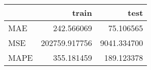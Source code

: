 \begin{tabular}{lrr}
\toprule
{} &          train &         test \\
\midrule
MAE  &     242.566069 &    75.106565 \\
MSE  &  202759.917756 &  9041.334700 \\
MAPE &     355.181459 &   189.123378 \\
\bottomrule
\end{tabular}
